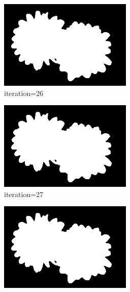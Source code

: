 \documentclass{article}
\begin{document}
\begin{figure}[t]
\begin{subfigure}[t]{0.19\textwidth}
\includegraphics[width=\textwidth]{./images/marginals_iter_26.png}
\vspace{-0.6cm}
\caption{iteration=26}
\end{subfigure}
\begin{subfigure}[t]{0.19\textwidth}
\centering
\includegraphics[width=\textwidth]{./images/marginals_iter_27.png}
\vspace{-0.6cm}
\caption{iteration=27}
\end{subfigure}
\begin{subfigure}[t]{0.19\textwidth}
\centering
\includegraphics[width=\textwidth]{./images/marginals_iter_28.png}

\end{subfigure}
\end{figure}
\end{document}
